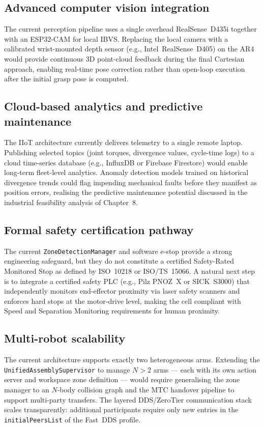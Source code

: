 \subsection{Advanced computer vision integration}
The current perception pipeline uses a single overhead RealSense~D435i together with an
ESP32-CAM for local IBVS.  Replacing the local camera with a calibrated wrist-mounted
depth sensor (e.g., Intel~RealSense~D405) on the AR4 would provide continuous 3D point-cloud
feedback during the final Cartesian approach, enabling real-time pose correction rather than
open-loop execution after the initial grasp pose is computed.

\subsection{Cloud-based analytics and predictive maintenance}
The IIoT architecture currently delivers telemetry to a single remote laptop.  Publishing
selected topics (joint torques, divergence values, cycle-time logs) to a cloud time-series
database (e.g., InfluxDB or Firebase Firestore) would enable long-term fleet-level analytics.
Anomaly detection models trained on historical divergence trends could flag impending mechanical
faults before they manifest as position errors, realising the predictive maintenance potential
discussed in the industrial feasibility analysis of Chapter~8.

\subsection{Formal safety certification pathway}
The current \texttt{ZoneDetectionManager} and software e-stop provide a strong engineering
safeguard, but they do not constitute a certified Safety-Rated Monitored Stop as defined by
ISO~10218 or ISO/TS~15066.  A natural next step is to integrate a certified safety PLC
(e.g., Pilz PNOZ~X or SICK~S3000) that independently monitors end-effector proximity via
laser safety scanners and enforces hard stops at the motor-drive level, making the cell
compliant with Speed and Separation Monitoring requirements for human proximity.

\subsection{Multi-robot scalability}
The current architecture supports exactly two heterogeneous arms.  Extending the
\texttt{UnifiedAssemblySupervisor} to manage $N>2$ arms — each with its own action server
and workspace zone definition — would require generalising the zone manager to an
$N$-body collision graph and the MTC handover pipeline to support multi-party transfers.
The layered DDS/ZeroTier communication stack scales transparently: additional participants
require only new entries in the \texttt{initialPeersList} of the Fast~DDS profile.

